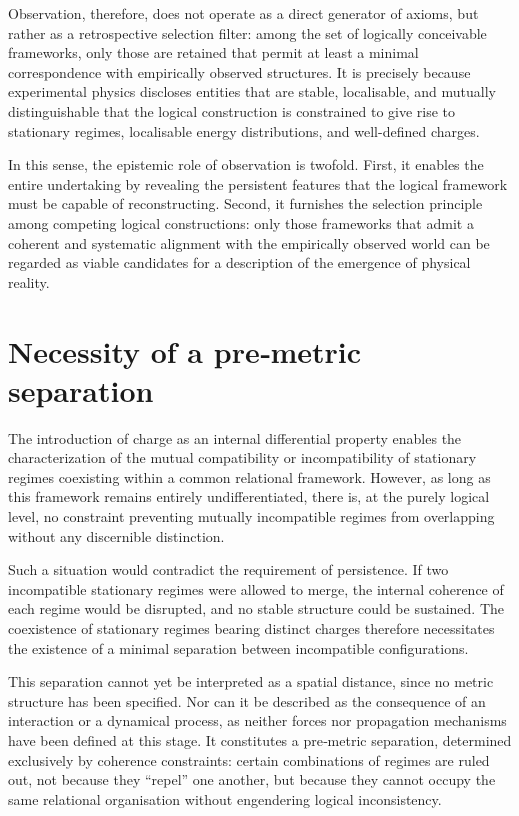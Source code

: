\documentclass[11pt,a4paper]{article}
\begin{document}
Observation, therefore, does not operate as a direct generator of axioms, but rather as a retrospective selection filter: among the set of logically conceivable frameworks, only those are retained that permit at least a minimal correspondence with empirically observed structures. It is precisely because experimental physics discloses entities that are stable, localisable, and mutually distinguishable that the logical construction is constrained to give rise to stationary regimes, localisable energy distributions, and well-defined charges.

In this sense, the epistemic role of observation is twofold. First, it enables the entire undertaking by revealing the persistent features that the logical framework must be capable of reconstructing. Second, it furnishes the selection principle among competing logical constructions: only those frameworks that admit a coherent and systematic alignment with the empirically observed world can be regarded as viable candidates for a description of the emergence of physical reality.

\section{Necessity of a pre‑metric separation}

The introduction of charge as an internal differential property enables the characterization of the mutual compatibility or incompatibility of stationary regimes coexisting within a common relational framework. However, as long as this framework remains entirely undifferentiated, there is, at the purely logical level, no constraint preventing mutually incompatible regimes from overlapping without any discernible distinction.

Such a situation would contradict the requirement of persistence. If two incompatible stationary regimes were allowed to merge, the internal coherence of each regime would be disrupted, and no stable structure could be sustained. The coexistence of stationary regimes bearing distinct charges therefore necessitates the existence of a minimal separation between incompatible configurations.

This separation cannot yet be interpreted as a spatial distance, since no metric structure has been specified. Nor can it be described as the consequence of an interaction or a dynamical process, as neither forces nor propagation mechanisms have been defined at this stage. It constitutes a pre‑metric separation, determined exclusively by coherence constraints: certain combinations of regimes are ruled out, not because they “repel” one another, but because they cannot occupy the same relational organisation without engendering logical inconsistency.
\end{document}
